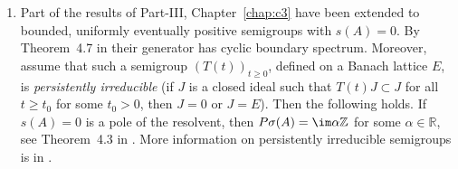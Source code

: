 \begin{enumerate}
\item
Part of the results of Part-III, Chapter~\ref{chap:c3} have been extended  to bounded,  uniformly eventually positive semigroups with $s(A)=0$. 
By Theorem~4.7 in \textcite{zbmath08029955} their generator has cyclic boundary spectrum. 
Moreover, assume that such a semigroup $(T(t))_{t\geq 0}$, defined on a  Banach lattice $E$, is \emph{persistently irreducible} (\ie if $J$ is a closed ideal such that $T(t)J \subset J$ for all $t\geq t_0$ for some  $t_0 > 0$, then $J = {0}$ or $J = E$).  
Then the following holds. 
If $s(A) = 0$ is a pole of the resolvent, then $P\sigma(A) = \im \alpha \mathbb{Z}$ for some $\alpha \in \mathbb{R}$, see Theorem~4.3 in \textcite{zbmath08029955}.
More information on persistently irreducible semigroups is in \textcite{zbmath07889246}.

\end{enumerate}
